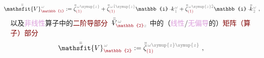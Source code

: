 \begin{align} \label{eq:matrix_exp-V1}
	\xint{\mathcolor{gray}{-}}{25}{\bar{\bar{\mathsfit{V}}}}^{\;\! \mathcolor{gray}{\omega}}_{\textcolor{Maroon}{\mathbb{1}}} := \bar{\bar{\zeta}}^{\;\! \mathcolor{gray}{\omega} \mathcolor{gray}{\symup{z}}}_{\textcolor{Maroon}{(1)}} + \bar{\bar{\zeta}}^{\;\! \mathcolor{gray}{\omega} \mathcolor{gray}{\check{1} \symup{z}}}_{\textcolor{Maroon}{(1)}} \mathbb{i} \xint{\begin{smallmatrix} ~ \\ {}^{}_{\mathcolor{gray}{-}} \\ ~ \end{smallmatrix}}{15}{k}_{\;\! \mathcolor{gray}{\check{1}}}^{\;\! \mathcolor{gray}{\omega}} + \bar{\bar{\zeta}}^{\;\! \mathcolor{gray}{\omega} \mathcolor{gray}{\symup{z} \check{2}}}_{\textcolor{Maroon}{(1)}} \mathbb{i} \xint{\begin{smallmatrix} ~ \\ {}^{}_{\mathcolor{gray}{-}} \\ ~ \end{smallmatrix}}{15}{\bar{\bar{k}}}_{\;\! \mathcolor{gray}{\check{2}}}^{\;\! \mathcolor{gray}{\omega}} ~, 
\end{align}
以及\textcolor{Plum}{非线性}算子中的\textcolor{Maroon}{二阶导部分} $\xint{\mathcolor{gray}{-}}{21}{\bar{\bar{V}}}^{\;\! \mathcolor{gray}{\omega}}_{\textcolor{Maroon}{\mathbb{2}} \mathcolor{gray}{z} }$ 中的（\textcolor{Plum}{线性}/\textcolor{Plum}{无偏导}的）\textcolor{Maroon}{矩阵（算子）部分}
\begin{align} \label{eq:matrix_exp-V2}
	\xint{\mathcolor{gray}{-}}{25}{\bar{\bar{\mathsfit{V}}}}^{\;\! \mathcolor{gray}{\omega}}_{\textcolor{Maroon}{\mathbb{2}}} := \bar{\bar{\zeta}}^{\;\! \mathcolor{gray}{\omega} \mathcolor{gray}{\symup{z} \symup{z}}}_{\textcolor{Maroon}{(1)}} ~, 
\end{align}
